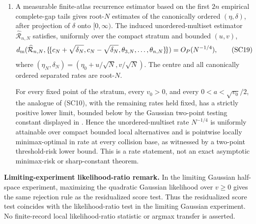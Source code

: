 \begin{paperthm}
\begin{enumerate}[label=\textup{(\roman*)},leftmargin=2.6em]
complement all give no rejection.  These piecewise definitions and the Borel
recurrence fit make \(\phi_N\) a total measurable function of every binary
record.  This gate is asymptotically inactive uniformly on the stated local
families.  The residualized score test is uniformly asymptotically level
\(\alpha\) and attains the Gaussian half-space
power envelope.  Specifically, \(\phi_N\) has uniform asymptotic level
\(\alpha\) for \(H_0:\delta=0\) and, at \(\delta_N=v/\sqrt N\), has
nuisance-adjusted limiting power
\[
 1-\Phi_{\rm N}\{z_{1-\alpha}-v\sqrt{J_n(\eta_0)}\}.
\tag{SC18}
\]

\item A measurable finite-atlas recurrence estimator based on the first
\(2n\) empirical complete-gap tails gives root-\(N\) estimates of the
canonically ordered \((\eta,\delta)\), after projection of \(\delta\) onto
\([0,\infty)\).  The induced unordered-multiset estimator
\(\widehat{\mathcal R}_{n,N}\) satisfies, uniformly over the compact stratum
and bounded \((u,v)\),
\[
 d_{\rm m}(\widehat{\mathcal R}_{n,N},
 \{\!\{c_N+\sqrt{\delta_N},c_N-\sqrt{\delta_N},
          \theta_{3,N},\ldots,\theta_{n,N}\}\!\})=O_P(N^{-1/4}),
\tag{SC19}
\]
where \((\eta_N,\delta_N)=(\eta_0+u/\sqrt N,v/\sqrt N)\).  The centre and
all canonically ordered separated rates are root-\(N\).

For every fixed point of the stratum, every \(v_0>0\), and every
\(0<a<\sqrt{v_0}/2\), the analogue of \textup{(SC10)}, with the remaining
rates held fixed, has a strictly positive lower limit, bounded below by the
Gaussian two-point testing constant displayed in
.  Hence the unordered-multiset rate
\(N^{-1/4}\) is uniformly attainable over compact bounded local alternatives
and is pointwise locally minimax-optimal in rate at every collision base, as
witnessed by a two-point threshold-risk lower bound.  This is a rate statement,
not an exact asymptotic minimax-risk or sharp-constant theorem.
\end{enumerate}
\end{paperthm}

\noindent\textbf{Limiting-experiment likelihood-ratio remark.}
In the limiting Gaussian half-space experiment, maximizing the quadratic
Gaussian likelihood over \(v\ge0\) gives the same rejection rule as the
residualized score test.  Thus the residualized score test coincides with the
likelihood-ratio test in the limiting Gaussian experiment.  No finite-record
local likelihood-ratio statistic or argmax transfer is asserted.





